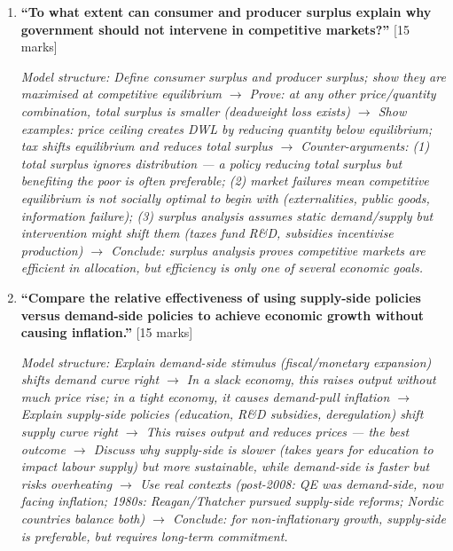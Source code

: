 \documentclass[11pt, a4paper, twoside]{book}
\begin{document}
\begin{exampractice}
\begin{enumerate}[leftmargin=*]
\item \textbf{``To what extent can consumer and producer surplus explain why government should not intervene in competitive markets?''} [15 marks]

\textit{Model structure: Define consumer surplus and producer surplus; show they are maximised at competitive equilibrium $\to$ Prove: at any other price/quantity combination, total surplus is smaller (deadweight loss exists) $\to$ Show examples: price ceiling creates DWL by reducing quantity below equilibrium; tax shifts equilibrium and reduces total surplus $\to$ Counter-arguments: (1) total surplus ignores distribution — a policy reducing total surplus but benefiting the poor is often preferable; (2) market failures mean competitive equilibrium is not socially optimal to begin with (externalities, public goods, information failure); (3) surplus analysis assumes static demand/supply but intervention might shift them (taxes fund R\&D, subsidies incentivise production) $\to$ Conclude: surplus analysis proves competitive markets are efficient in allocation, but efficiency is only one of several economic goals.}

\item \textbf{``Compare the relative effectiveness of using supply-side policies versus demand-side policies to achieve economic growth without causing inflation.''} [15 marks]

\textit{Model structure: Explain demand-side stimulus (fiscal/monetary expansion) shifts demand curve right $\to$ In a slack economy, this raises output without much price rise; in a tight economy, it causes demand-pull inflation $\to$ Explain supply-side policies (education, R\&D subsidies, deregulation) shift supply curve right $\to$ This raises output \emph{and} reduces prices — the best outcome $\to$ Discuss why supply-side is slower (takes years for education to impact labour supply) but more sustainable, while demand-side is faster but risks overheating $\to$ Use real contexts (post-2008: QE was demand-side, now facing inflation; 1980s: Reagan/Thatcher pursued supply-side reforms; Nordic countries balance both) $\to$ Conclude: for non-inflationary growth, supply-side is preferable, but requires long-term commitment.}

\end{enumerate}
\end{exampractice}

\end{document}
